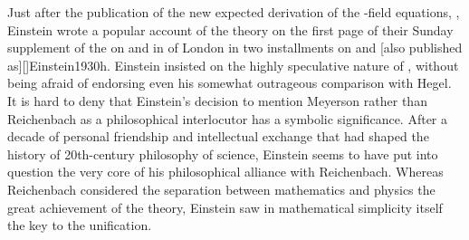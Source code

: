 \documentclass[draft]{article}
\newcommand{\FP}{\german{Fernparallelismus}\xspace}
\begin{document}
Just after the publication of the new expected derivation of the \FP-field equations, \citep{Einstein1929b}, Einstein wrote a popular account of the theory on the first page of their Sunday supplement of the  on  and in  of London in two installments on  and  [also published as][]{Einstein1930h}. Einstein insisted on the highly speculative nature of \uftp, without being afraid of endorsing even his somewhat outrageous comparison with Hegel. It is hard to deny that Einstein's decision to mention Meyerson rather than Reichenbach as a philosophical interlocutor has a symbolic significance. After a decade of personal friendship and intellectual exchange that had shaped the history of 20th-century philosophy of science, Einstein seems to have put into question the very core of his philosophical alliance with Reichenbach. Whereas Reichenbach considered the separation between mathematics and physics the great achievement of the theory, Einstein saw in mathematical simplicity itself the key to the unification.
\end{document}
